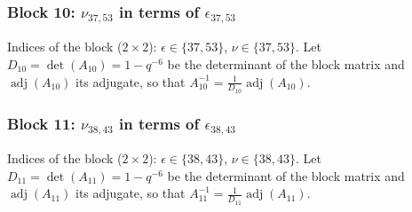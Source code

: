 \subsubsection{Block 10: $\nu_{37, 53}$ in terms of $\epsilon_{37, 53}$}
Indices of the block ($2\times 2$): $\epsilon \in \{37, 53\}$, $\nu \in \{37, 53\}$.
Let $D_{10} = \det(A_{10}) = 1-q^{-6}$ be the determinant of the block matrix and $\operatorname{adj}(A_{10})$ its adjugate, so that $A_{10}^{-1} = \frac{1}{D_{10}}\operatorname{adj}(A_{10})$.
\begin{center}
\end{center}

\subsubsection{Block 11: $\nu_{38, 43}$ in terms of $\epsilon_{38, 43}$}
Indices of the block ($2\times 2$): $\epsilon \in \{38, 43\}$, $\nu \in \{38, 43\}$.
Let $D_{11} = \det(A_{11}) = 1-q^{-6}$ be the determinant of the block matrix and $\operatorname{adj}(A_{11})$ its adjugate, so that $A_{11}^{-1} = \frac{1}{D_{11}}\operatorname{adj}(A_{11})$.
\begin{center}
\end{center}

